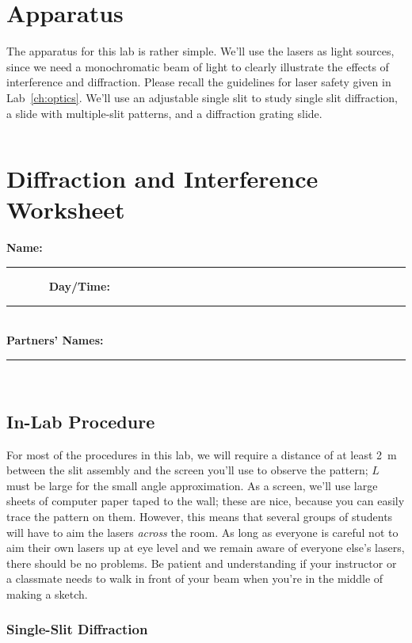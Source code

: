 \section{Apparatus}

The apparatus for this lab is rather simple.  We'll use the lasers as light 
sources, since we need a monochromatic beam of light to clearly illustrate the
effects of interference and diffraction. Please recall the guidelines for 
laser safety given in Lab~\ref{ch:optics}. We'll use an adjustable single
slit to study single slit diffraction, a slide with multiple-slit patterns, and
a diffraction grating slide.

\vfill
\pagebreak
$$
$$
\vfill
\clearpage
\newpage


\renewcommand{\thesection}{\thechapter.W}

\section{Diffraction and Interference Worksheet}
{\bf \Large Name:}~ \rule{5cm}{.1mm}~~~~~~~
{\bf \Large Day/Time:}~\rule{3cm}{.1mm}\\ 
{\bf \large Partners' Names:}~\rule{6cm}{.1mm}\\

\subsection{In-Lab Procedure}

For most of the procedures in this lab, we will require a distance of at least
2~m between the slit assembly and the screen you'll use to observe the pattern;
$L$ must be large for the small angle approximation.  As a screen, we'll 
use large sheets of computer paper taped to the wall; these are nice, because 
you can easily trace the pattern on them.  However, this means that several 
groups of students will have to aim the lasers {\it across} the room.  As long
as everyone is careful not to aim their own lasers up at eye level and we 
remain aware of everyone else's lasers, there should be no problems.  Be 
patient and understanding if your instructor or a classmate needs to walk in
front of your beam when you're in the middle of making a sketch.
 
\subsubsection{Single-Slit Diffraction}  

